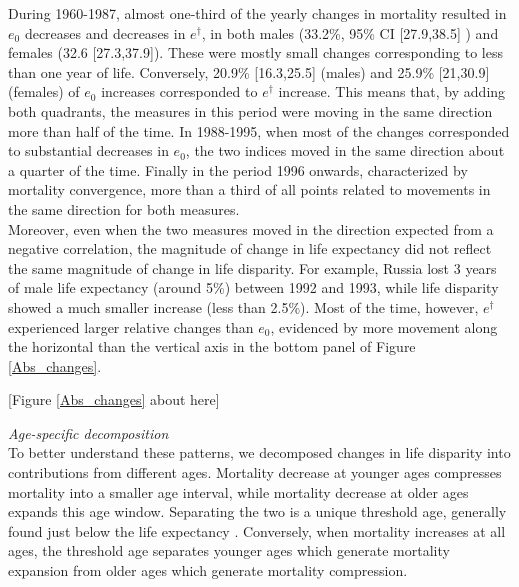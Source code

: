\documentclass{article}
\begin{document}
\begin{spacing}{1.5}
During 1960-1987, almost one-third of the yearly changes in mortality resulted in $e_0$ decreases and decreases in $e^\dagger$, in both males (33.2\%, 95\% CI [27.9,38.5] ) and females (32.6 [27.3,37.9]). These were mostly small changes corresponding to less than one year of life. Conversely, 20.9\% [16.3,25.5] (males) and 25.9\% [21,30.9](females) of $e_0$ increases corresponded to $e^\dagger$ increase. This means that, by adding both quadrants, the measures in this period were moving in the same direction more than half of the time.  In 1988-1995, when most of the changes corresponded to substantial decreases in $e_0$, the two indices moved in the same direction about a quarter of the time. Finally in the period 1996 onwards, characterized by mortality convergence, more than a third of all points related to movements in the same direction for both measures. \\

Moreover, even when the two measures moved in the direction expected from a negative correlation, the magnitude of change in life expectancy did not reflect the same magnitude of change in life disparity. For example, Russia lost 3 years of male life expectancy (around 5\%) between 1992 and 1993, while life disparity showed a much smaller increase (less than 2.5\%). Most of the time, however, $e^\dagger$ experienced larger relative changes than $e_0$, evidenced by more movement along the horizontal than the vertical axis in the bottom panel of Figure \ref{Abs_changes}.


\begin{center}
[Figure \ref{Abs_changes} about here]
\end{center}

\emph{Age-specific decomposition}\\

To better understand these patterns, we decomposed changes in life disparity into contributions from different ages. Mortality decrease at younger ages compresses mortality into a smaller age interval, while mortality decrease at older ages expands this age window. Separating the two is a unique threshold age, generally found just below the life expectancy \citep{zhang2009}. Conversely, when mortality increases at all ages, the threshold age separates younger ages which generate mortality expansion from older ages which generate mortality compression.


\end{spacing}
\end{document}
